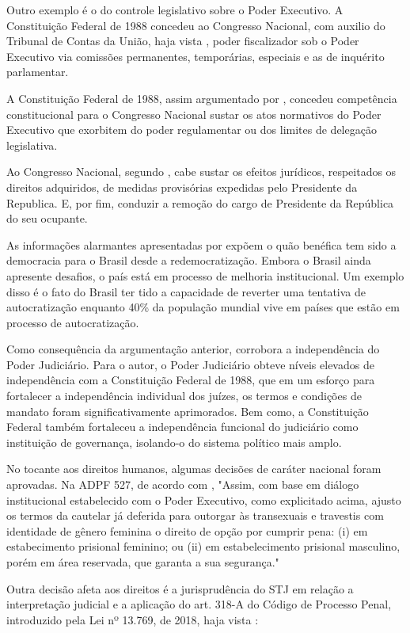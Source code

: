 Outro exemplo é o do controle legislativo sobre o Poder Executivo. A Constituição Federal de 1988 concedeu ao Congresso Nacional, com auxilio do Tribunal de Contas da União, haja vista \cite{cf88}, poder fiscalizador sob o Poder Executivo via comissões permanentes, temporárias, especiais e as de inquérito parlamentar.

A Constituição Federal de 1988, assim argumentado por \cite{cf88}, concedeu competência constitucional para o Congresso Nacional sustar os atos normativos do Poder Executivo que exorbitem do poder regulamentar ou dos limites de delegação legislativa.

Ao Congresso Nacional, segundo \cite{cf88}, cabe sustar os efeitos jurídicos, respeitados os direitos adquiridos, de medidas provisórias expedidas pelo Presidente da Republica. E, por fim, conduzir a remoção do cargo de Presidente da República do seu ocupante.

As informações alarmantes apresentadas por \cite{nord2025democracy} expõem o quão benéfica tem sido a democracia para o Brasil desde a redemocratização. Embora o Brasil ainda apresente desafios, o país está em processo de melhoria institucional. Um exemplo disso é o fato do Brasil ter tido a capacidade de reverter uma tentativa de autocratização enquanto 40\%  da população mundial vive em países que estão em processo de autocratização.

Como consequência da argumentação anterior, \cite{pires2021paradoxo} corrobora a independência do Poder Judiciário. Para o autor, o Poder Judiciário obteve níveis elevados de independência com a Constituição Federal de 1988, que em um esforço para fortalecer a independência individual dos juízes, os termos e condições de mandato foram significativamente aprimorados.  Bem como, a Constituição Federal também fortaleceu a independência funcional do judiciário como instituição de governança, isolando-o do sistema político mais amplo.

No tocante aos direitos humanos, algumas decisões de caráter nacional foram aprovadas. Na ADPF 527, de acordo com \cite{adpf527}, "Assim, com base em diálogo institucional estabelecido com o Poder Executivo, como explicitado acima, ajusto os termos da cautelar já deferida para outorgar às transexuais e travestis com identidade de gênero feminina o direito de opção por cumprir pena: (i) em estabecimento prisional feminino; ou (ii) em estabelecimento prisional masculino, porém em área reservada, que garanta a sua segurança."

Outra decisão afeta aos direitos é a jurisprudência do STJ em relação a interpretação judicial e a aplicação do art. 318-A do Código de Processo Penal, introduzido pela Lei nº 13.769, de 2018, haja vista \cite{cpp}:

